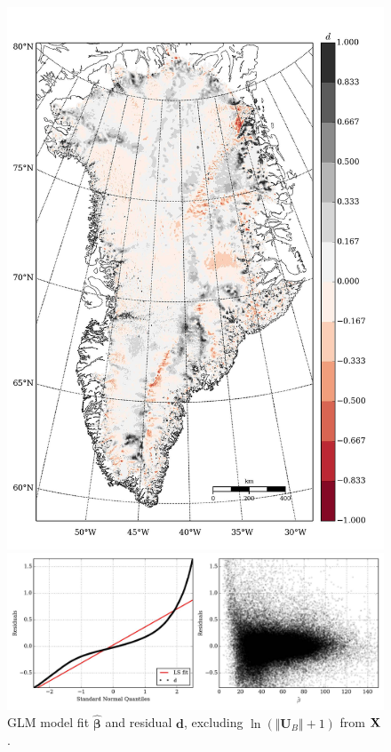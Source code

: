 \begin{figure}
\begin{minipage}[b]{0.47\linewidth}
    \includegraphics[width=1.0\textwidth]{images/greenland/stats/GLM_resid_no_U.jpg}
  \end{minipage}
  \begin{minipage}[b]{0.99\linewidth}
    \includegraphics[width=1.0\textwidth]{images/greenland/stats/GLM_resid-NQ_no_U.jpg}
  \end{minipage}
  \caption[]{GLM model fit $\bm{\hat{\beta}}$ and residual $\mathbf{d}$, excluding $\ln\left(\Vert \mathbf{U}_B \Vert + 1\right)$ from $\mathbf{X}$.}
\end{figure}

